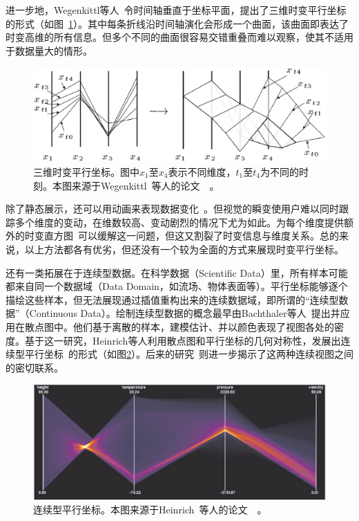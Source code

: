 \documentclass[12pt,twocolumn]{article}
\begin{document}
进一步地，Wegenkittl等人~\citep{wegenkittl1997visualizing}令时间轴垂直于坐标平面，提出了三维时变平行坐标的形式（如图~\ref{fig:PC_Data_Time2}）。其中每条折线沿时间轴演化会形成一个曲面，该曲面即表达了时变高维的所有信息。但多个不同的曲面很容易交错重叠而难以观察，使其不适用于数据量大的情形。

\begin{figure}[!htb]
\centering
\includegraphics[width=1.0\linewidth]{images/PC_Data_Time2.eps}
\caption{\label{fig:PC_Data_Time2}三维时变平行坐标。图中$x_1$至$x_4$表示不同维度，$t_1$至$t_4$为不同的时刻。本图来源于Wegenkittl~等人的论文~\citep{wegenkittl1997visualizing}~。
}
\end{figure}

除了静态展示，还可以用动画来表现数据变化~\citep{barlow2004animator}。但视觉的瞬变使用户难以同时跟踪多个维度的变动，在维数较高、变动剧烈的情况下尤为如此。为每个维度提供额外的时变直方图~\citep{blaas2008extensions}可以缓解这一问题，但这又割裂了时变信息与维度关系。总的来说，以上方法都各有优劣，但还没有一个较为全面的方式来展现时变平行坐标。

还有一类拓展在于连续型数据。在科学数据（Scientific Data）里，所有样本可能都来自同一个数据域（Data Domain，如流场、物体表面等）。平行坐标能够逐个描绘这些样本，但无法展现通过插值重构出来的连续数据域，即所谓的“连续型数据”（Continuous Data）。绘制连续型数据的概念最早由Bachthaler等人~\citep{bachthaler2008continuous}提出并应用在散点图中。他们基于离散的样本，建模估计、并以颜色表现了视图各处的密度。基于这一研究，Heinrich等人利用散点图和平行坐标的几何对称性，发展出连续型平行坐标~\citep{heinrich2009continuous}的形式（如图\ref{fig:PC_Data_Continuous2}）。后来的研究~\citep{lehmann2011features}则进一步揭示了这两种连续视图之间的密切联系。

\begin{figure}[!htb]
\centering
\includegraphics[width=1.0\linewidth]{images/PC_Data_Continuous2.eps}
\caption{\label{fig:PC_Data_Continuous2}连续型平行坐标。本图来源于Heinrich~等人的论文~\citep{heinrich2009continuous}~。
}
\end{figure}
\end{document}
